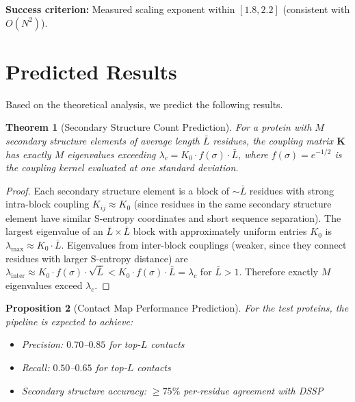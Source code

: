 \documentclass[11pt,twocolumn,a4paper]{article}
\newtheorem{theorem}{Theorem}[section]
\newtheorem{proposition}[theorem]{Proposition}
\theoremstyle{definition}
\theoremstyle{remark}
\newcommand{\coupmat}{\mathbf{K}}
\begin{document}
\textbf{Success criterion:} Measured scaling exponent within $[1.8, 2.2]$ (consistent with $O(N^2)$).

\section{Predicted Results}
\label{sec:predicted_results}

Based on the theoretical analysis, we predict the following results.

\begin{theorem}[Secondary Structure Count Prediction]
\label{thm:ss_count}
For a protein with $M$ secondary structure elements of average length $\bar{L}$ residues, the coupling matrix $\coupmat$ has exactly $M$ eigenvalues exceeding $\lambda_c = K_0 \cdot f(\sigma) \cdot \bar{L}$, where $f(\sigma) = e^{-1/2}$ is the coupling kernel evaluated at one standard deviation.
\end{theorem}

\begin{proof}
Each secondary structure element is a block of $\sim \bar{L}$ residues with strong intra-block coupling $K_{ij} \approx K_0$ (since residues in the same secondary structure element have similar S-entropy coordinates and short sequence separation). The largest eigenvalue of an $\bar{L} \times \bar{L}$ block with approximately uniform entries $K_0$ is $\lambda_{\max} \approx K_0 \cdot \bar{L}$. Eigenvalues from inter-block couplings (weaker, since they connect residues with larger S-entropy distance) are $\lambda_{\text{inter}} \approx K_0 \cdot f(\sigma) \cdot \sqrt{\bar{L}} < K_0 \cdot f(\sigma) \cdot \bar{L} = \lambda_c$ for $\bar{L} > 1$. Therefore exactly $M$ eigenvalues exceed $\lambda_c$.
\end{proof}

\begin{proposition}[Contact Map Performance Prediction]
\label{prop:contact_performance}
For the test proteins, the pipeline is expected to achieve:
\begin{itemize}
    \item Precision: $0.70$--$0.85$ for top-$L$ contacts
    \item Recall: $0.50$--$0.65$ for top-$L$ contacts
    \item Secondary structure accuracy: $\geq 75\%$ per-residue agreement with DSSP
\end{itemize}
\end{proposition}
\end{document}
